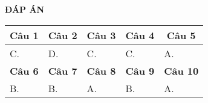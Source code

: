 \begin{center}
	\textbf{ĐÁP ÁN}
	\begin{longtable}[\textwidth]{|p{}|p{}|p{}|p{}|p{}|}
		\hline%
		\multicolumn{1}{|c}{\textbf{Câu 1}} & \multicolumn{1}{|c|}{\textbf{Câu 2}} & \multicolumn{1}{c|}{\textbf{Câu 3}} &
		\multicolumn{1}{c|}{\textbf{Câu 4}} &
		\multicolumn{1}{c|}{\textbf{Câu 5}} \\
		\hline
		C.&D. &C. &C. &A. 	\\
		\hline
		
		
		\multicolumn{1}{|c|}{\textbf{Câu 6}} &
		\multicolumn{1}{c|}{\textbf{Câu 7}} &
		\multicolumn{1}{c|}{\textbf{Câu 8}} &
		\multicolumn{1}{c|}{\textbf{Câu 9}} & \multicolumn{1}{c|}{\textbf{Câu 10}} \\
		\hline
		B. &B. &A.&B. &A. \\
		\hline	
		
		
	\end{longtable}
	
	
	
\end{center}









